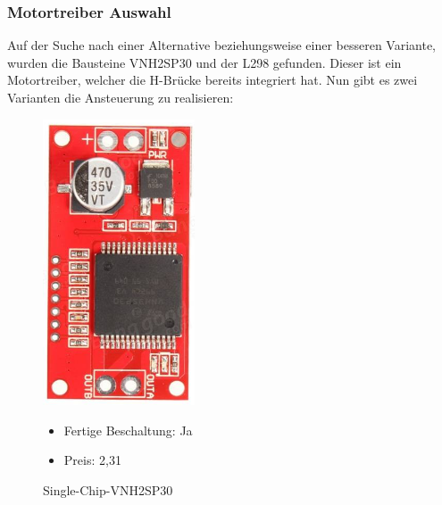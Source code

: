 \newpage
\subsubsection{Motortreiber Auswahl}
\label{sec:motortreiberAuswahl}

Auf der Suche nach einer Alternative beziehungsweise einer besseren Variante, wurden die Bausteine VNH2SP30 und der L298 gefunden. Dieser ist ein Motortreiber, welcher die H-Brücke bereits integriert hat. Nun gibt es zwei Varianten die Ansteuerung zu realisieren:

\begin{figure}[H]
\begin{minipage}[t]{0.45\textwidth}
\begin{center}
\includegraphics[width=0.4\textwidth]{fig/Motortreiber}
\caption{Single-Chip-VNH2SP30}
\end{center}

\begin{itemize}
	\item{Fertige Beschaltung: Ja}
	\item{Preis: 2,31\textsf{\texteuro} \cite{preisMotortreiber}} %
\end{itemize}

\end{minipage}
\hspace{0.1\textwidth}
\begin{minipage}[t]{0.45\textwidth}


\end{minipage}
\end{figure}
